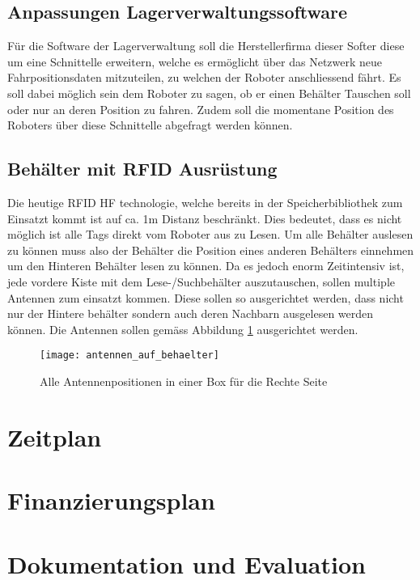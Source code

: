 \section{Anpassungen Lagerverwaltungssoftware}
\label{sec:roboterSWAnpassung}
Für die Software der Lagerverwaltung soll die Herstellerfirma dieser Softer diese um eine Schnittelle erweitern, welche es ermöglicht über das Netzwerk neue Fahrpositionsdaten mitzuteilen, zu welchen der Roboter anschliessend fährt. Es soll dabei möglich sein dem Roboter zu sagen, ob er einen Behälter Tauschen soll oder nur an deren Position zu fahren. Zudem soll die momentane Position des Roboters über diese Schnittelle abgefragt werden können. 

\section{Behälter mit RFID Ausrüstung}
\label{sec:behaelterMitRFID}
Die heutige RFID HF technologie, welche bereits in der Speicherbibliothek zum Einsatzt kommt ist auf ca. 1m Distanz beschränkt. Dies bedeutet, dass es nicht möglich ist alle Tags direkt vom Roboter aus zu Lesen. Um alle Behälter auslesen zu können muss also der Behälter die Position eines anderen Behälters einnehmen um den Hinteren Behälter lesen zu können. Da es jedoch enorm Zeitintensiv ist, jede vordere Kiste mit dem Lese-/Suchbehälter auszutauschen, sollen multiple Antennen zum einsatzt kommen. Diese sollen so ausgerichtet werden, dass nicht nur der Hintere behälter sondern auch deren Nachbarn ausgelesen werden können.
Die Antennen sollen gemäss Abbildung \ref{fig:antennenPositionen} ausgerichtet werden.

\begin{figure}
	\centering
	\texttt{[image: antennen\_auf\_behaelter]}
	\caption{Alle Antennenpositionen in einer Box für die Rechte Seite}
	\label{fig:antennenPositionen}
\end{figure}


\chapter{Zeitplan}

\chapter{Finanzierungsplan}

\chapter{Dokumentation und Evaluation}